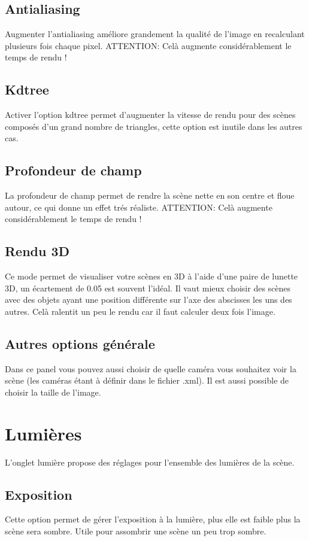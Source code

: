 \documentclass{report}
\begin{document}
\section{Antialiasing}
Augmenter l'antialiasing am\'eliore grandement la qualit\'e de l'image en recalculant plusieurs fois chaque pixel.
\newline ATTENTION: Cel\`a augmente consid\'erablement le temps de rendu !
\section{Kdtree}
Activer l'option kdtree permet d'augmenter la vitesse de rendu pour des sc\`enes compos\'es d'un grand nombre de triangles, cette option est inutile dans les autres cas.
\section{Profondeur de champ}
La profondeur de champ permet de rendre la sc\`ene nette en son centre et floue autour, ce qui donne un effet tr\'es r\'ealiste.
\newline ATTENTION: Cel\`a augmente consid\'erablement le temps de rendu !
\section{Rendu 3D}
Ce mode permet de visualiser votre sc\`enes en 3D \`a l'aide d'une paire de lunette 3D, un \'ecartement de 0.05 est souvent l'id\'eal.
\newline Il vaut mieux choisir des sc\`enes avec des objets ayant une position diff\'erente sur l'axe des abscisses les uns des autres.
\newline Cel\`a ralentit un peu le rendu car il faut calculer deux fois l'image.
\section{Autres options g\'en\'erale}
Dans ce panel vous pouvez aussi choisir de quelle cam\'era vous souhaitez voir la sc\`ene (les cam\'eras \'etant \`a d\'efinir dans le fichier .xml).
\newline Il est aussi possible de choisir la taille de l'image.
\chapter{Lumi\`eres}
L'onglet lumi\`ere propose des r\'eglages pour l'ensemble des lumi\`eres de la sc\`ene.
\section{Exposition}
Cette option permet de g\'erer l'exposition \`a la lumi\`ere, plus elle est faible plus la sc\`ene sera sombre.
\newline Utile pour assombrir une sc\`ene un peu trop sombre.
\end{document}
